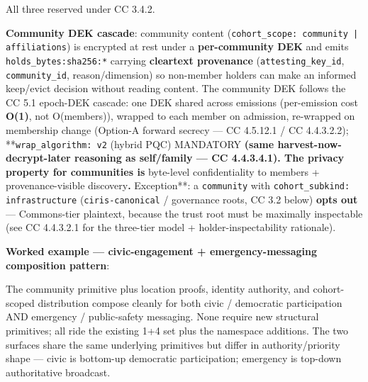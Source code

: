 \documentclass[11pt]{article}
\begin{document}
All three reserved under CC 3.4.2.


\textbf{Community DEK cascade}: community content (\texttt{cohort\_scope: community | affiliations}) is encrypted at rest under a \textbf{per-community DEK} and emits \texttt{holds\_bytes:sha256:*} carrying \textbf{cleartext provenance} (\texttt{attesting\_key\_id}, \texttt{community\_id}, reason/dimension) so non-member holders can make an informed keep/evict decision without reading content. The community DEK follows the CC 5.1 epoch-DEK cascade: one DEK shared across emissions (per-emission cost \textbf{O(1)}, not O(members)), wrapped to each member on admission, re-wrapped on membership change (Option-A forward secrecy — CC 4.5.12.1 / CC 4.4.3.2.2); **\texttt{wrap\_algorithm: v2} (hybrid PQC) MANDATORY\textbf{ (same harvest-now-decrypt-later reasoning as self/family — CC 4.4.3.4.1). The privacy property for communities is }byte-level confidentiality to members + provenance-visible discovery\textbf{. }Exception**: a \texttt{community} with \texttt{cohort\_subkind: infrastructure} (\texttt{ciris-canonical} / governance roots, CC 3.2 below) \textbf{opts out} — Commons-tier plaintext, because the trust root must be maximally inspectable (see CC 4.4.3.2.1 for the three-tier model + holder-inspectability rationale).


\textbf{Worked example — civic-engagement + emergency-messaging composition pattern}:


The community primitive plus location proofs, identity authority, and cohort-scoped distribution compose cleanly for both civic / democratic participation AND emergency / public-safety messaging. None require new structural primitives; all ride the existing 1+4 set plus the namespace additions. The two surfaces share the same underlying primitives but differ in authority/priority shape — civic is bottom-up democratic participation; emergency is top-down authoritative broadcast.
\end{document}
